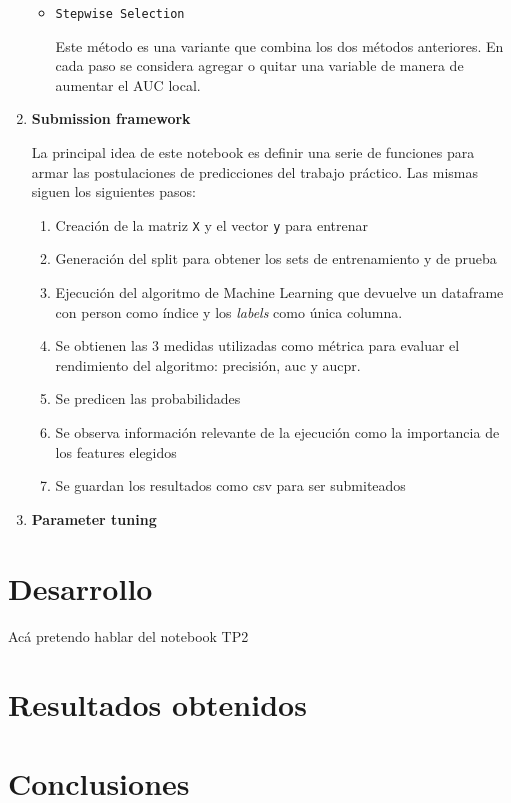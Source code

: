 \documentclass[a4paper]{article}
\begin{document}
\begin{enumerate}
\begin {itemize}
\item \texttt{Stepwise Selection}

Este método es una variante que combina los dos métodos anteriores. En cada paso se considera agregar o quitar una variable de manera de aumentar el AUC local.	

\end {itemize}

\item \textbf{Submission framework}

La principal idea de este notebook es definir una serie de funciones para armar las postulaciones de predicciones del trabajo práctico. Las mismas siguen los siguientes pasos:

\begin{enumerate}
	\item Creación de la matriz \texttt{X} y el vector \texttt{y} para entrenar
	\item Generación del split para obtener los sets de entrenamiento y de prueba
	\item Ejecución del algoritmo de Machine Learning que devuelve un dataframe con person como índice y los \textit{labels} como única columna.
	\item Se obtienen las 3 medidas utilizadas como métrica para evaluar el rendimiento del algoritmo: precisión, auc y aucpr.
	\item Se predicen las probabilidades 
	\item Se observa información relevante de la ejecución como la importancia de los features elegidos
	\item Se guardan los resultados como csv para ser submiteados
	
\end{enumerate}

\item \textbf{Parameter tuning}

\end{enumerate}

\section{Desarrollo}
Acá pretendo hablar del notebook TP2

\section{Resultados obtenidos}

\section{Conclusiones}
\end{document}
